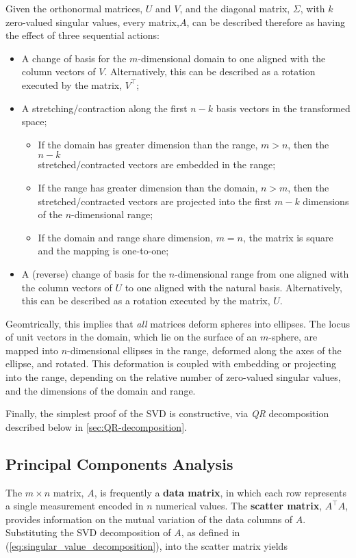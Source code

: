 \documentclass[12pt, twoside, draft]{article}
\begin{document}
Given the orthonormal matrices, $U$ and $V$, and the diagonal matrix, $\Sigma$, with $k$ zero-valued singular values, every matrix,$A$, can be described therefore as having the effect of three sequential actions:
\begin{itemize}[noitemsep]
\item A change of basis for the $m$-dimensional domain to one aligned with the column vectors of $V$.  Alternatively, this can be described as a rotation executed by the matrix, $V^\top$;
\item A stretching/contraction along the first $n-k$ basis vectors in the transformed space;
\begin{itemize}[noitemsep]
\item If the domain has greater dimension than the range, $m > n$, then the $n-k$ \\ stretched/contracted vectors are embedded in the range;
\item If the range has greater dimension than the domain, $n > m$, then the stretched/contracted vectors are projected into the first $m-k$ dimensions of the $n$-dimensional range;
\item If the domain and range share dimension, $m = n$, the matrix is square and the mapping is one-to-one;
\end{itemize}
\item A (reverse) change of basis for the $n$-dimensional range from one aligned with the column vectors of $U$ to one aligned with the natural basis.  Alternatively, this can be described as a rotation executed by the matrix, $U$.
\end{itemize}

Geomtrically, this implies that \textit{all} matrices deform spheres into ellipses.  The locus of unit vectors in the domain, which lie on the surface of an $m$-sphere, are mapped into $n$-dimensional ellipses in the range, deformed along the axes of the ellipse, and rotated.  This deformation is coupled with embedding or projecting into the range, depending on the relative number of zero-valued singular values, and the dimensions of the domain and range.

Finally, the simplest proof of the SVD is constructive, via \textit{QR} decomposition described below in \ref{sec:QR-decomposition}.


\subsection{Principal Components Analysis}\label{principal-components-analysis}
The $m \times n$ matrix, $A$, is frequently a \textbf{data matrix}, in which each row represents a single measurement encoded in $n$ numerical values.  The \textbf{scatter matrix}, $A^\top A$, provides information on the mutual variation of the data columns of $A$.  Substituting the SVD decomposition of $A$, as defined in (\ref{eq:singular_value_decomposition}), into the scatter matrix yields
\end{document}
